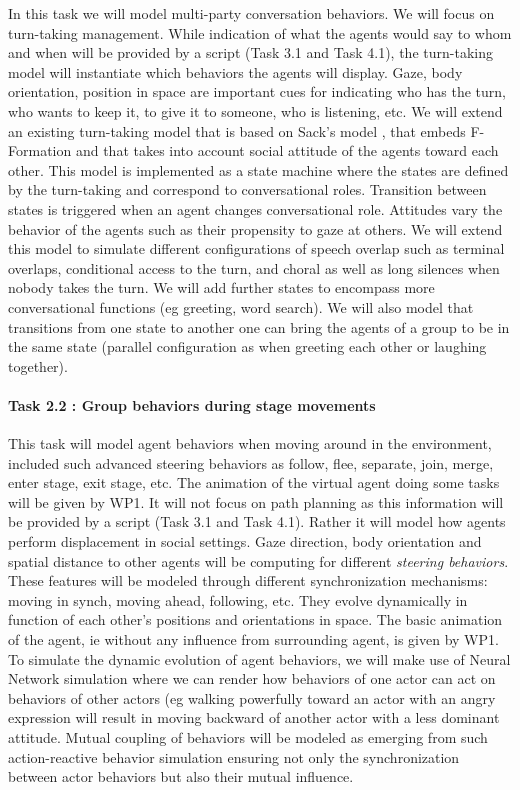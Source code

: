In this task we will model multi-party conversation behaviors. We will focus on turn-taking management. While indication of what the agents would say to whom and when will be provided by a script (Task 3.1 and Task 4.1), the turn-taking model will instantiate which behaviors the agents will display. Gaze, body orientation, position in space are important cues for indicating who has the turn, who wants to keep it, to give it to someone, who is listening, etc.  We will extend an existing turn-taking model \cite{ RavenetCOP14} that is based on Sack's model \cite{SAC74}, that embeds F-Formation \cite{Kendon90}  and that takes into account social attitude of the agents toward each other. This model is implemented as a state machine where the states are defined by the turn-taking and correspond to conversational roles. Transition between states is triggered when an agent changes conversational role. Attitudes vary the behavior of the agents such as their propensity to gaze at others. We will extend this model to 
simulate different configurations of speech overlap such as terminal overlaps, conditional access to the turn, and choral \cite{Schegloff2000} as well as long silences when nobody takes the turn. We will add further states to encompass more conversational functions (eg greeting, word search). We will also model that transitions from one state to another one can bring the agents of a group to be in the same state (parallel configuration as when greeting each other or laughing together).


\paragraph{Task 2.2 : Group behaviors during stage movements}

This task will model agent behaviors when moving around in the environment,  included such  advanced  steering behaviors as follow, flee, separate, join, merge, enter stage, exit stage, etc. The animation of the virtual agent doing some tasks will be given by WP1. It will not focus on path planning as this information will be provided by a script (Task 3.1 and Task 4.1). Rather it will model how agents perform displacement in social settings. Gaze direction, body orientation and spatial distance to other agents will be computing for different {\em steering behaviors}. These features will be modeled through different synchronization mechanisms: moving in synch, moving ahead, following, etc. They evolve dynamically in function of each other's  positions and orientations in space. The basic animation of the agent, ie without any influence from surrounding agent, is given by WP1. To simulate the dynamic evolution of agent behaviors,  we will make use of Neural Network simulation \cite{Prepin2013} where we can 
render how behaviors of one actor can act on behaviors of other actors (eg walking powerfully toward an actor with an angry expression will result in moving backward of another actor with a less dominant attitude. Mutual coupling of behaviors will be modeled as emerging from such action-reactive behavior simulation \cite{Prepin2013} ensuring not only the synchronization between actor behaviors but also their mutual influence. 



